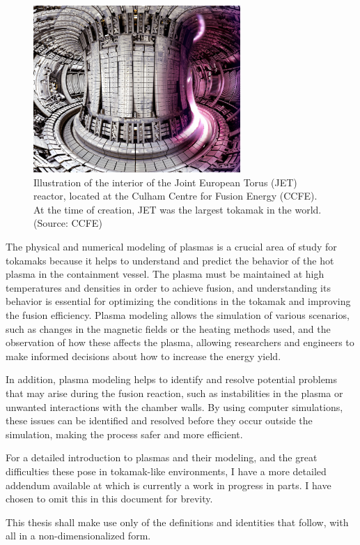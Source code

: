     \begin{figure}[!ht]
        \centering
        \includegraphics[width = 0.7\textwidth]{0 - introduction/images/JET.jpg}
        \caption{Illustration of the interior of the Joint European Torus (JET) reactor, located at the Culham Centre for Fusion Energy (CCFE). At the time of creation, JET was the largest tokamak in the world. (Source: CCFE)}
    \end{figure}

    \shortline

    The physical and numerical modeling of plasmas is a crucial area of study for tokamaks because it helps to understand and predict the behavior of the hot plasma in the containment vessel. The plasma must be maintained at high temperatures and densities in order to achieve fusion, and understanding its behavior is essential for optimizing the conditions in the tokamak and improving the fusion efficiency. Plasma modeling allows the simulation of various scenarios, such as changes in the magnetic fields or the heating methods used, and the observation of how these affects the plasma, allowing researchers and engineers to make informed decisions about how to increase the energy yield.

    In addition, plasma modeling helps to identify and resolve potential problems that may arise during the fusion reaction, such as instabilities in the plasma or unwanted interactions with the chamber walls. By using computer simulations, these issues can be identified and resolved before they occur outside the simulation, making the process safer and more efficient.
    
    \shortline

    \begin{remark}[Addendum]
        For a detailed introduction to plasmas and their modeling, and the great difficulties these pose in tokamak-like environments, I have a more detailed addendum available at \cite{addendum} which is currently a work in progress in parts. I have chosen to omit this in this document for brevity.
        
        This thesis shall make use only of the definitions and identities that follow, with all in a non-dimensionalized form.
    \end{remark}

